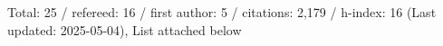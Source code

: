 Total: 25 / refereed: 16 / first author: 5 / citations: 2,179 / h-index: 16 (Last updated: 2025-05-04), List attached below